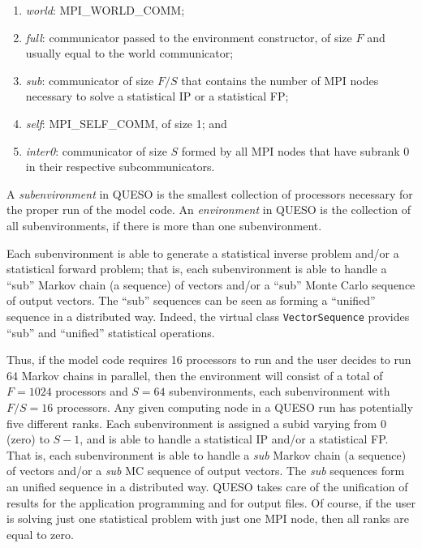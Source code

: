 \begin{enumerate}

\item {\it world}: MPI\_WORLD\_COMM;
\item {\it full}: communicator passed to the environment constructor, of size $F$ and usually equal to the world communicator;
\item {\it sub}: communicator of size $F/S$ that contains the number of MPI nodes necessary to solve a statistical IP or a statistical FP;
\item {\it self}: MPI\_SELF\_COMM, of size 1; and
\item {\it inter0}: communicator of size $S$ formed by all MPI nodes that have subrank 0 in their respective subcommunicators.
 
\end{enumerate}


A {\it subenvironment} in QUESO is the smallest collection of processors
necessary for the proper run of the model code.  An {\it environment} in QUESO
is the collection of all subenvironments, if there is more than one
subenvironment.


Each subenvironment is able to generate a statistical inverse problem and/or a
statistical forward problem; that is, each subenvironment is able to handle a
``sub'' Markov chain (a sequence) of vectors and/or a ``sub'' Monte Carlo
sequence of output vectors.  The ``sub'' sequences can be seen as forming a
``unified'' sequence in a distributed way.  Indeed, the virtual class
\verb+VectorSequence+ provides ``sub'' and ``unified'' statistical operations. 

Thus, if the model code requires 16 processors to run and the user decides to run 64 Markov chains in parallel,
then the environment will consist of a total of $F=1024$ processors and $S=64$ subenvironments, each subenvironment with $F/S=16$ processors.
Any given computing node in a QUESO run has potentially five different ranks.
Each subenvironment is assigned a subid varying from $0$ (zero) to $S-1$, and is able to handle a statistical IP and/or a statistical FP.
That is, each subenvironment is able to handle a {\it sub} Markov chain (a sequence) of vectors and/or a {\it sub} MC sequence of output vectors.
The {\it sub} sequences form an unified sequence in a distributed way.
QUESO takes care of the unification of results for the application programming and for output files.  Of course, if the user is solving just one statistical problem with just one MPI node, then all ranks are equal to zero.


